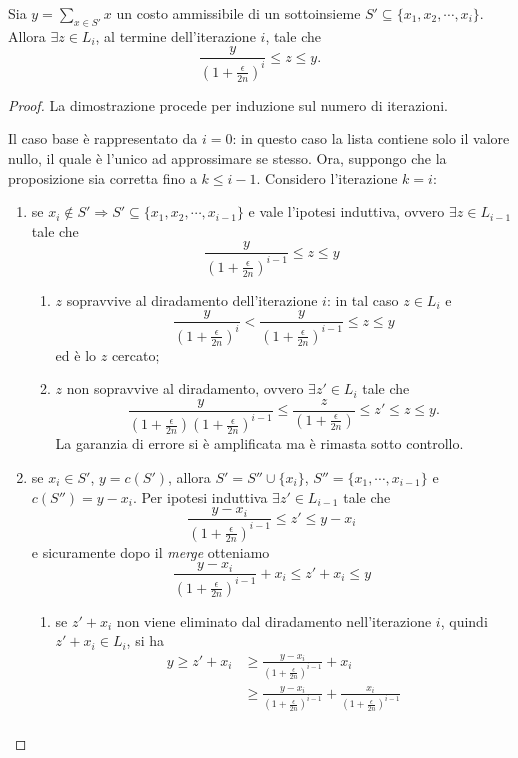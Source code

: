 \begin{lemma}
Sia $y=\sum_{x\in S'} x$ un costo ammissibile di un sottoinsieme $S'\subseteq \{x_1, x_2, \cdots , x_i\}$. Allora $\exists z \in L_i$, al termine dell'iterazione $i$, tale che
\[
\frac{y}{\left(1+\frac{\epsilon}{2n}\right)^i} \leq z \leq y.
\]
\end{lemma}
\begin{proof}
La dimostrazione procede per induzione sul numero di iterazioni.

Il caso base è rappresentato da $i=0$: in questo caso la lista contiene solo il valore nullo, il quale è l'unico ad approssimare se stesso. Ora, suppongo che la proposizione sia corretta fino a $k \leq i-1$. Considero l'iterazione $k=i$:
\begin{enumerate}
\item se $x_i\notin S' \Rightarrow S'\subseteq \{x_1, x_2, \cdots , x_{i-1}\}$ e vale l'ipotesi induttiva, ovvero $\exists z \in L_{i-1}$ tale che
\[
\frac{y}{\left(1+\frac{\epsilon}{2n}\right)^{i-1}} \leq z \leq y
\]
\begin{enumerate}
\item $z$ sopravvive al diradamento dell'iterazione $i$: in tal caso $z\in L_i$ e
\[
\frac{y}{\left(1+\frac{\epsilon}{2n}\right)^i} < \frac{y}{\left(1+\frac{\epsilon}{2n}\right)^{i-1}} \leq z \leq y
\]
ed è lo $z$ cercato;
\item $z$ non sopravvive al diradamento, ovvero $\exists z'\in L_i$ tale che
\[
\frac{y}{\left(1+\frac{\epsilon}{2n}\right)\left(1+\frac{\epsilon}{2n}\right)^{i-1}} \leq \frac{z}{\left(1+\frac{\epsilon}{2n}\right)} \leq z' \leq z \leq y.
\]
La garanzia di errore si è amplificata ma è rimasta sotto controllo.
\end{enumerate}
\item se $x_i\in S'$, $y=c(S')$, allora $S'=S'' \cup \{x_i\}$, $S''=\{x_1, \cdots , x_{i-1}\}$ e $c(S'')=y-x_i$. Per ipotesi induttiva $\exists z' \in L_{i-1}$ tale che
\[
\frac{y-x_i}{\left(1+\frac{\epsilon}{2n}\right)^{i-1}} \leq z' \leq y-x_i
\]
e sicuramente dopo il \textit{merge} otteniamo
\[
\frac{y-x_i}{\left(1+\frac{\epsilon}{2n}\right)^{i-1}} +x_i \leq z' + x_i \leq y
\]
\begin{enumerate}
\item se $z'+x_i$ non viene eliminato dal diradamento nell'iterazione $i$, quindi $z'+x_i\in L_i$, si ha
\[
\begin{split}
y \geq z'+x_i &\geq \frac{y-x_i}{\left(1+\frac{\epsilon}{2n}\right)^{i-1}} +x_i  \\
&\geq \frac{y-x_i}{\left(1+\frac{\epsilon}{2n}\right)^{i-1}} +\frac{x_i}{\left(1+\frac{\epsilon}{2n}\right)^{i-1}}   \\

\end{split}\]
\end{enumerate}
\end{enumerate}
\end{proof}
